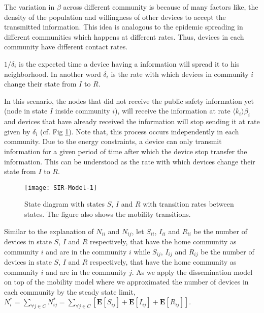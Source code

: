\documentclass[review]{elsarticle}
\begin{document}
The variation in $\beta$ across different community is because of many factors like, the density of the population and willingness of other devices to accept the transmitted information. This idea is analogous to the epidemic spreading in different communities which happens at different rates. Thus, devices in each community have different contact rates.

\begin{definition}\label{defdelta}
$1/\delta_{i}$ is the expected time a device having a information will spread it to his neighborhood. In another word $\delta_{i}$ is the rate with which devices in community $i$ change their state from $I$ to $R$.
\end{definition}

In this scenario, the nodes that did not receive the public safety information yet (node in state $I$ inside community $i$), will receive the information at rate $\langle k_{i}\rangle \beta_i$ and devices that have already received the information will stop sending it at rate given by $\delta_{i}$ (cf. Fig \ref{fig:SIR1}). Note that, this process occurs independently in each community. Due to the energy constraints, a device can only transmit information for a given period of time after which the device stop transfer the information. This can be understood as the rate with which devices change their state from $I$ to $R$.

\begin{figure}\centering
    \texttt{[image: SIR-Model-1]}
    \caption{State diagram with states $S$, $I$ and $R$ with transition rates between states. The figure also shows the mobility transitions.}
    \label{fig:SIR1}
\end{figure}

Similar to the explanation of $N_{ii}$ and $N_{ij}$, let $S_{ii}$, $I_{ii}$ and $R_{ii}$ be the number of devices in state $S$, $I$ and $R$ respectively, that have the home community as community $i$ and are in the community $i$ while $S_{ij}$, $I_{ij}$ and $R_{ij}$ be the number of devices in state $S$, $I$ and $R$ respectively, that have the home community as community $i$ and are in the community $j$. As we apply the dissemination model on top of the mobility model where we approximated the number of devices in each community by the steady state limit, $\displaystyle N_{i}^{*}=\sum_{\forall j\in C}N_{ij}^{*}=\sum_{\forall j\in C}\left[ \mathbf{E}[S_{ij}]+\mathbf{E}[I_{ij}]+\mathbf{E}[R_{ij}]\right]$.
\end{document}
